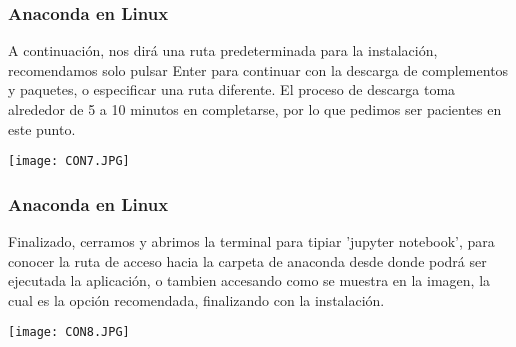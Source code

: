 \documentclass[spanish]{beamer}
\begin{document}
\newpage
\begin{frame}[fragile]\frametitle{Anaconda en Linux}
\setlength{\parskip}{5mm}\justify
A continuación, nos dirá una ruta predeterminada para la instalación, recomendamos solo pulsar Enter para continuar con la descarga de complementos y paquetes, o especificar una ruta diferente. El proceso de descarga toma alrededor de 5 a 10 minutos en completarse, por lo que pedimos ser pacientes en este punto.

\centering\texttt{[image: CON7.JPG]}

\end{frame}
\newpage
\begin{frame}[fragile]\frametitle{Anaconda en Linux}
\setlength{\parskip}{5mm}\justify
Finalizado, cerramos y abrimos la terminal para tipiar 'jupyter notebook', para conocer la ruta de acceso hacia la carpeta de anaconda desde donde podrá ser ejecutada la aplicación, o tambien accesando como se muestra en la imagen, la cual es la opción recomendada, finalizando con la instalación.

\centering\texttt{[image: CON8.JPG]}

\end{frame}
\end{document}

